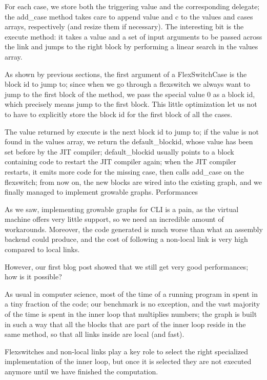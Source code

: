 {For each case, we store both the triggering value and the corresponding delegate; the add_case method takes care to append value and c to the values and cases arrays, respectively (and resize them if necessary). The interesting bit is the execute method: it takes a value and a set of input arguments to be passed across the link and jumps to the right block by performing a linear search in the values array.

As shown by previous sections, the first argument of a FlexSwitchCase is the block id to jump to; since when we go through a flexswitch we always want to jump to the first block of the method, we pass the special value 0 as a block id, which precisely means jump to the first block. This little optimization let us not to have to explicitly store the block id for the first block of all the cases.

The value returned by execute is the next block id to jump to; if the value is not found in the values array, we return the default_blockid, whose value has been set before by the JIT compiler; default_blockid usually points to a block containing code to restart the JIT compiler again; when the JIT compiler restarts, it emits more code for the missing case, then calls add_case on the flexswitch; from now on, the new blocks are wired into the existing graph, and we finally managed to implement growable graphs.
Performances

As we saw, implementing growable graphs for CLI is a pain, as the virtual machine offers very little support, so we need an incredible amount of workarounds. Moreover, the code generated is much worse than what an assembly backend could produce, and the cost of following a non-local link is very high compared to local links.

However, our first blog post showed that we still get very good performances; how is it possible?

As usual in computer science, most of the time of a running program in spent in a tiny fraction of the code; our benchmark is no exception, and the vast majority of the time is spent in the inner loop that multiplies numbers; the graph is built in such a way that all the blocks that are part of the inner loop reside in the same method, so that all links inside are local (and fast).

Flexswitches and non-local links play a key role to select the right specialized implementation of the inner loop, but once it is selected they are not executed anymore until we have finished the computation.

}
